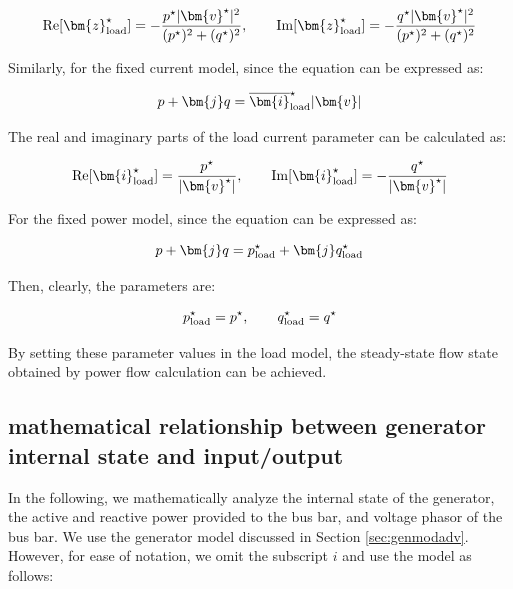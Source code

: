 \documentclass[graybox, envcountchap]{svmult}
\begin{document}
\begin{equation}\label{eq:lmodimppara}
  \operatorname{Re} [\bm{z}_{\rm load}^{\star}] = - \frac{ p^{\star} |\bm{v}^{\star}|^2 }{(p^{\star})^2 + (q^{\star})^2}
  ,\qquad
  \operatorname{Im} [\bm{z}_{\rm load}^{\star}] = - \frac{ q^{\star} |\bm{v}^{\star}|^2 }{(p^{\star})^2 + (q^{\star})^2}
\end{equation}

Similarly, for the fixed current model, since the equation can be expressed as:

\begin{equation}
  p + \bm{j} q = \overline{\bm{i}}_{\rm load}^{\star} |\bm{v}|
\end{equation}

The real and imaginary parts of the load current parameter can be calculated as:

\begin{equation*}
  \operatorname{Re} [\bm{i}_{\rm load}^{\star}] =\frac{p^{\star} }{|\bm{v}^{\star}|},\qquad
  \operatorname{Im} [\bm{i}_{\rm load}^{\star}] = -\frac{ q^{\star} }{|\bm{v}^{\star}|}
\end{equation*}

For the fixed power model, since the equation can be expressed as:

\begin{equation}
  p + \bm{j} q =
  p_{{\rm load}}^{\star} + \bm{j} q_{{\rm load}}^{\star} 
\end{equation}

Then, clearly, the parameters are:

\begin{equation*}
  p_{\rm load}^{\star}=p^{\star}
  ,\qquad
  q_{\rm load}^{\star}=q^{\star}
\end{equation*}

By setting these parameter values in the load model, the steady-state flow state
obtained by power flow calculation can be achieved.

\subsection{mathematical relationship between generator internal state and
input/output\advanced}\label{sec:gensspq}

In the following, we mathematically analyze the internal state of the generator,
the active and reactive power provided to the bus bar, and voltage phasor of the
bus bar. We use the generator model discussed in Section \ref{sec:genmodadv}.
However, for ease of notation, we omit the subscript $i$ and use the model as
follows:
\end{document}
